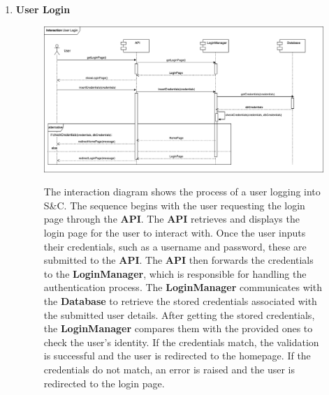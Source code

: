\begin{enumerate}
    \item \textbf{User Login}
    \begin{figure}[h!]
            \centering  \includegraphics[width=1\textwidth]{DD/Images/Interactions/INT01_UserLogin.drawio.png}
            \label{fig:ComponentViewDiagram}
            \caption*{The interaction diagram shows the process of a user logging into S\&C. The sequence begins with the user requesting the login page through the \textbf{API}. The \textbf{API} retrieves and displays the login page for the user to interact with. Once the user inputs their credentials, such as a username and password, these are submitted to the \textbf{API}. The \textbf{API} then forwards the credentials to the \textbf{LoginManager}, which is responsible for handling the authentication process. The \textbf{LoginManager} communicates with the \textbf{Database} to retrieve the stored credentials associated with the submitted user details. After getting the stored credentials, the \textbf{LoginManager} compares them with the provided ones to check the user's identity. If the credentials match, the validation is successful and the user is redirected to the homepage. If the credentials do not match, an error is raised and the user is redirected to the login page.
            }
    \end{figure}



\end{enumerate}

